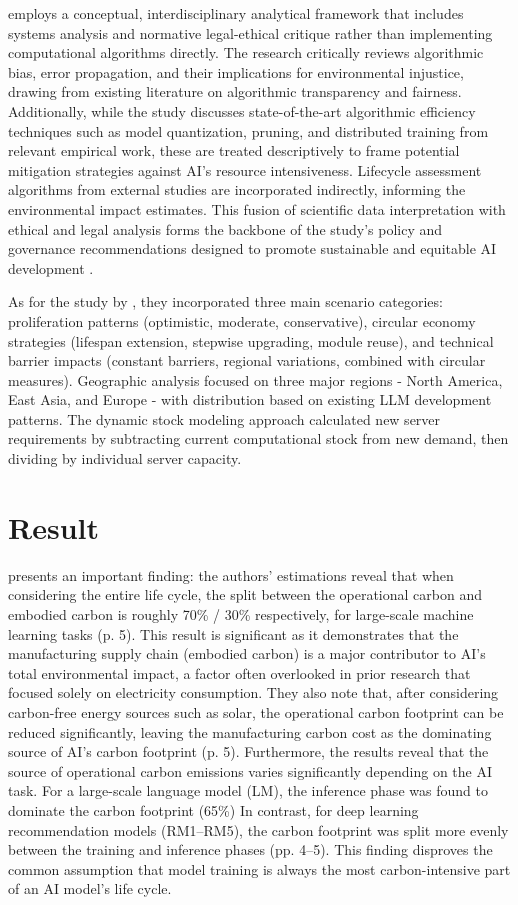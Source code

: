 \documentclass[a4paper, 12pt]{article}
\begin{document}
\par \citet{Zhuk2023} employs a conceptual, interdisciplinary analytical framework that includes systems analysis and normative legal-ethical critique rather than implementing computational algorithms directly. The research critically reviews algorithmic bias, error propagation, and their implications for environmental injustice, drawing from existing literature on algorithmic transparency and fairness. Additionally, while the study discusses state-of-the-art algorithmic efficiency techniques such as model quantization, pruning, and distributed training from relevant empirical work, these are treated descriptively to frame potential mitigation strategies against AI’s resource intensiveness. Lifecycle assessment algorithms from external studies are incorporated indirectly, informing the environmental impact estimates. This fusion of scientific data interpretation with ethical and legal analysis forms the backbone of the study’s policy and governance recommendations designed to promote sustainable and equitable AI development \citep[pp.~25--29]{Zhuk2023}.
\par As for the study by \cite{wang_2024_ewaste}, they incorporated three main scenario categories: proliferation patterns (optimistic, moderate, conservative), circular economy strategies (lifespan extension, stepwise upgrading, module reuse), and technical barrier impacts (constant barriers, regional variations, combined with circular measures). Geographic analysis focused on three major regions - North America, East Asia, and Europe - with distribution based on existing LLM development patterns. The dynamic stock modeling approach calculated new server requirements by subtracting current computational stock from new demand, then dividing by individual server capacity.

\section{Result}
\citet{Wu2022} presents an important finding: the authors' estimations reveal that when considering the entire life cycle, the split between the operational carbon and embodied carbon is roughly 70\% / 30\% respectively, for large-scale machine learning tasks (p. 5). This result is significant as it demonstrates that the manufacturing supply chain (embodied carbon) is a major contributor to AI's total environmental impact, a factor often overlooked in prior research that focused solely on electricity consumption. They also note that, after considering carbon-free energy sources such as solar, the operational carbon footprint can be reduced significantly, leaving the manufacturing carbon cost as the dominating source of AI's carbon footprint (p. 5). Furthermore, the results reveal that the source of operational carbon emissions varies significantly depending on the AI task. For a large-scale language model (LM), the inference phase was found to dominate the carbon footprint (65\%) In contrast, for deep learning recommendation models (RM1–RM5), the carbon footprint was split more evenly between the training and inference phases (pp. 4–5). This finding disproves the common assumption that model training is always the most carbon-intensive part of an AI model's life cycle.
\end{document}
